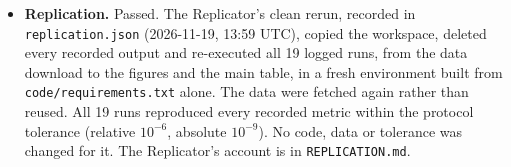 \begin{itemize}
        \url{https://github.com/brycewang-stanford/Free-Research-Crew/tree/main/gallery/ss-lalonde-observational}.
        It contains the plan with its deviations and disclosures, the run ledger and notes, the
        code, the data manifest (the data files themselves are fetched, not committed), every
        review, the archived briefs and the source notes.
  \item \textbf{Replication.} Passed. The Replicator's clean rerun, recorded in
        \texttt{replication.json} (2026-11-19, 13:59 UTC), copied the workspace, deleted every
        recorded output and re-executed all 19 logged runs, from the data download to the
        figures and the main table, in a fresh environment built from
        \texttt{code/requirements.txt} alone. The data were fetched again rather than reused.
        All 19 runs reproduced every recorded metric within the protocol tolerance (relative
        $10^{-6}$, absolute $10^{-9}$). No code, data or tolerance was changed for it. The
        Replicator's account is in \texttt{REPLICATION.md}.
\end{itemize}
